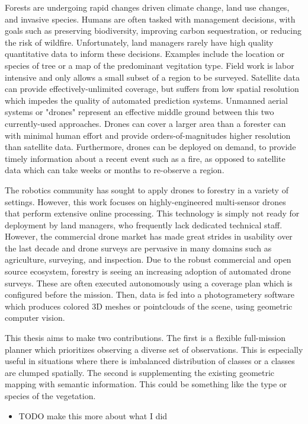 
\setlength{\parskip}{1em}
\setlength{\parindent}{0em}

Forests are undergoing rapid changes driven climate change, land use changes, and invasive species. Humans are often tasked with management decisions, with goals such as preserving biodiversity, improving carbon sequestration, or reducing the risk of wildfire. Unfortunately, land managers rarely have high quality quantitative data to inform these decisions. Examples include the location or species of tree or a map of the predominant vegitation type.
Field work is labor intensive and only allows a small subset of a region to be surveyed. Satellite data can provide effectively-unlimited coverage, but suffers from low spatial resolution which impedes the quality of automated prediction systems. Unmanned aerial systems or "drones" represent an effective middle ground between this two currently-used approaches. Drones can cover a larger area than a forester can with minimal human effort and provide orders-of-magnitudes higher resolution than satellite data. Furthermore, drones can be deployed on demand, to provide timely information about a recent event such as a fire, as opposed to satellite data which can take weeks or months to re-observe a region. 

The robotics community has sought to apply drones to forestry in a variety of settings. However, this work focuses on highly-engineered multi-sensor drones that perform extensive online processing. This technology is simply not ready for deployment by land managers, who frequently lack dedicated technical staff. However, the commercial drone market has made great strides in usability over the last decade and drone surveys are pervasive in many domains such as agriculture, surveying, and inspection. Due to the robust commercial and open source ecosystem, forestry is seeing an increasing adoption of automated drone surveys. These are often executed autonomously using a coverage plan which is configured before the mission. Then, data is fed into a photogrametery software which produces colored 3D meshes or pointclouds of the scene, using geometric computer vision. 

This thesis aims to make two contributions. The first is a flexible full-mission planner which prioritizes observing a diverse set of observations. This is especially useful in situations where there is imbalanced distribution of classes or a classes are clumped spatially. The second is supplementing the existing geometric mapping with semantic information. This could be something like the type or species of the vegetation.

\begin{itemize}
    \item TODO make this more about what I did
\end{itemize}

\noindent